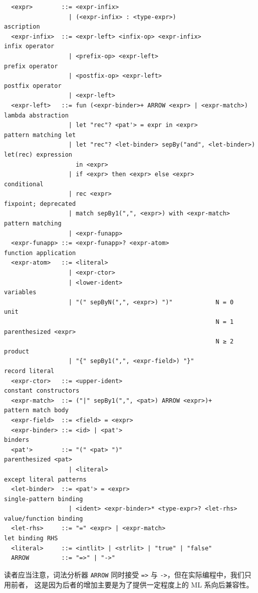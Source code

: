 \documentclass[a4paper, 11pt]{article}
\theoremstyle{remark}\newtheorem*{remark}{Remark}
\theoremstyle{definition}\newtheorem*{definition}{Definition}
\begin{document}
\begin{verbatim}
  <expr>        ::= <expr-infix>
                  | (<expr-infix> : <type-expr>)                        ascription
  <expr-infix>  ::= <expr-left> <infix-op> <expr-infix>                 infix operator
                  | <prefix-op> <expr-left>                             prefix operator
                  | <postfix-op> <expr-left>                            postfix operator
                  | <expr-left>
  <expr-left>   ::= fun (<expr-binder>+ ARROW <expr> | <expr-match>)    lambda abstraction
                  | let "rec"? <pat'> = expr in <expr>                  pattern matching let
                  | let "rec"? <let-binder> sepBy("and", <let-binder>)  let(rec) expression
                    in <expr>
                  | if <expr> then <expr> else <expr>                   conditional
                  | rec <expr>                                          fixpoint; deprecated
                  | match sepBy1(",", <expr>) with <expr-match>         pattern matching
                  | <expr-funapp>
  <expr-funapp> ::= <expr-funapp>? <expr-atom>                          function application
  <expr-atom>   ::= <literal>
                  | <expr-ctor>
                  | <lower-ident>                                       variables
                  | "(" sepByN(",", <expr>) ")"            N = 0        unit
                                                           N = 1        parenthesized <expr>
                                                           N ≥ 2        product
                  | "{" sepBy1(",", <expr-field>) "}"                   record literal
  <expr-ctor>   ::= <upper-ident>                                       constant constructors
  <expr-match>  ::= ("|" sepBy1(",", <pat>) ARROW <expr>)+              pattern match body
  <expr-field>  ::= <field> = <expr>
  <expr-binder> ::= <id> | <pat'>                                       binders
  <pat'>        ::= "(" <pat> ")"                                       parenthesized <pat>
                  | <literal>                                           except literal patterns
  <let-binder>  ::= <pat'> = <expr>                                     single-pattern binding
                  | <ident> <expr-binder>* <type-expr>? <let-rhs>       value/function binding
  <let-rhs>     ::= "=" <expr> | <expr-match>                           let binding RHS
  <literal>     ::= <intlit> | <strlit> | "true" | "false"
  ARROW         ::= "=>" | "->"
\end{verbatim}
读者应当注意，词法分析器 \texttt{ARROW} 同时接受 \texttt{=>} 与 \texttt{->}，但在实际编程中，我们只用前者，
这是因为后者的增加主要是为了提供一定程度上的 ML 系向后兼容性。
\end{document}
